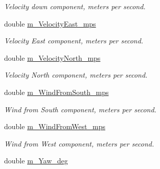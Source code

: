 \begin{DoxyCompactItemize}
\begin{DoxyCompactList}\small\item\em Velocity down component, meters per second. \end{DoxyCompactList}\item 
\hypertarget{class_piccolo_telemetry_belief_a4d5c2ae85f26b7c6591fb9fc40213f62}{
double \hyperlink{class_piccolo_telemetry_belief_a4d5c2ae85f26b7c6591fb9fc40213f62}{m\_\-VelocityEast\_\-mps}}
\label{class_piccolo_telemetry_belief_a4d5c2ae85f26b7c6591fb9fc40213f62}

\begin{DoxyCompactList}\small\item\em Velocity East component, meters per second. \end{DoxyCompactList}\item 
\hypertarget{class_piccolo_telemetry_belief_adc4fb6468dbe1171eaa69bf6c54a194b}{
double \hyperlink{class_piccolo_telemetry_belief_adc4fb6468dbe1171eaa69bf6c54a194b}{m\_\-VelocityNorth\_\-mps}}
\label{class_piccolo_telemetry_belief_adc4fb6468dbe1171eaa69bf6c54a194b}

\begin{DoxyCompactList}\small\item\em Velocity North component, meters per second. \end{DoxyCompactList}\item 
\hypertarget{class_piccolo_telemetry_belief_a6a3568aa024e4b2ddb3cb0a7e2a3136b}{
double \hyperlink{class_piccolo_telemetry_belief_a6a3568aa024e4b2ddb3cb0a7e2a3136b}{m\_\-WindFromSouth\_\-mps}}
\label{class_piccolo_telemetry_belief_a6a3568aa024e4b2ddb3cb0a7e2a3136b}

\begin{DoxyCompactList}\small\item\em Wind from South component, meters per second. \end{DoxyCompactList}\item 
\hypertarget{class_piccolo_telemetry_belief_ab24e6d52bcb44428e4c26d090fe0c7aa}{
double \hyperlink{class_piccolo_telemetry_belief_ab24e6d52bcb44428e4c26d090fe0c7aa}{m\_\-WindFromWest\_\-mps}}
\label{class_piccolo_telemetry_belief_ab24e6d52bcb44428e4c26d090fe0c7aa}

\begin{DoxyCompactList}\small\item\em Wind from West component, meters per second. \end{DoxyCompactList}\item 
\hypertarget{class_piccolo_telemetry_belief_ab00073a7d95b368f79b1689b7a2cbac6}{
double \hyperlink{class_piccolo_telemetry_belief_ab00073a7d95b368f79b1689b7a2cbac6}{m\_\-Yaw\_\-deg}}
\label{class_piccolo_telemetry_belief_ab00073a7d95b368f79b1689b7a2cbac6}


\end{DoxyCompactItemize}
